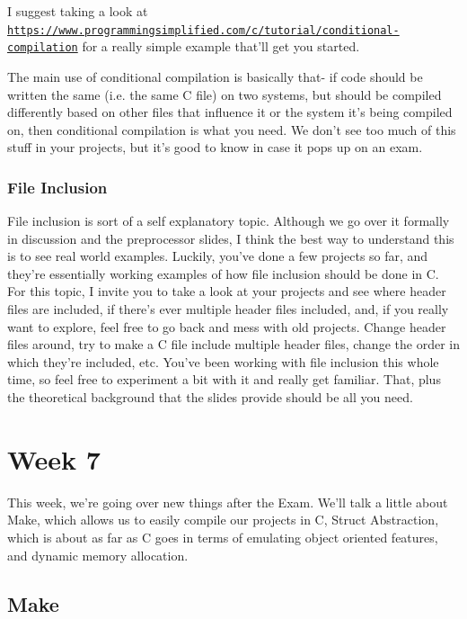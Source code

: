\documentclass[english, 10pt]{article}
\begin{document}
I suggest taking a look at \texttt{\href{https://www.programmingsimplified.com/c/tutorial/conditional-compilation}{https://www.programmingsimplified.com/c/tutorial/conditional-compilation}} for a really simple example that'll get you started.\newline

The main use of conditional compilation is basically that- if code should be written the same (i.e. the same C file) on two systems, but should be compiled differently based on other files that influence it or the system it's being compiled on, then conditional compilation is what you need. We don't see too much of this stuff in your projects, but it's good to know in case it pops up on an exam.

\subsubsection{File Inclusion}

File inclusion is sort of a self explanatory topic. Although we go over it formally in discussion and the preprocessor slides, I think the best way to understand this is to see real world examples. Luckily, you've done a few projects so far, and they're essentially working examples of how file inclusion should be done in C. For this topic, I invite you to take a look at your projects and see where header files are included, if there's ever multiple header files included, and, if you really want to explore, feel free to go back and mess with old projects. Change header files around, try to make a C file include multiple header files, change the order in which they're included, etc. You've been working with file inclusion this whole time, so feel free to experiment a bit with it and really get familiar. That, plus the theoretical background that the slides provide should be all you need.

\section{Week 7}

This week, we're going over new things after the Exam. We'll talk a little about Make, which allows us to easily compile our projects in C, Struct Abstraction, which is about as far as C goes in terms of emulating object oriented features, and dynamic memory allocation.

\subsection{Make}
\end{document}
